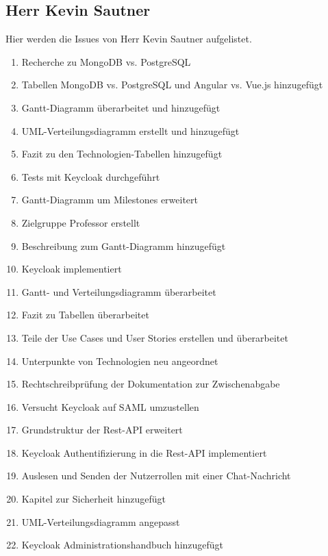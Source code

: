 \subsection{Herr Kevin Sautner}
Hier werden die Issues von Herr Kevin Sautner aufgelistet.
\begin{enumerate}
    \item Recherche zu MongoDB vs. PostgreSQL
    \item Tabellen MongoDB vs. PostgreSQL und Angular vs. Vue.js hinzugefügt
    \item Gantt-Diagramm überarbeitet und hinzugefügt
    \item UML-Verteilungsdiagramm erstellt und hinzugefügt
    \item Fazit zu den Technologien-Tabellen hinzugefügt
    \item Tests mit Keycloak durchgeführt
    \item Gantt-Diagramm um Milestones erweitert
    \item Zielgruppe Professor erstellt
    \item Beschreibung zum Gantt-Diagramm hinzugefügt
    \item Keycloak implementiert
    \item Gantt- und Verteilungsdiagramm überarbeitet
    \item Fazit zu Tabellen überarbeitet
    \item Teile der Use Cases und User Stories erstellen und überarbeitet
    \item Unterpunkte von Technologien neu angeordnet
    \item Rechtschreibprüfung der Dokumentation zur Zwischenabgabe
    \item Versucht Keycloak auf SAML umzustellen
    \item Grundstruktur der Rest-API erweitert
    \item Keycloak Authentifizierung in die Rest-API implementiert
    \item Auslesen und Senden der Nutzerrollen mit einer Chat-Nachricht
    \item Kapitel zur Sicherheit hinzugefügt
    \item UML-Verteilungsdiagramm angepasst
    \item Keycloak Administrationshandbuch hinzugefügt
\end{enumerate}